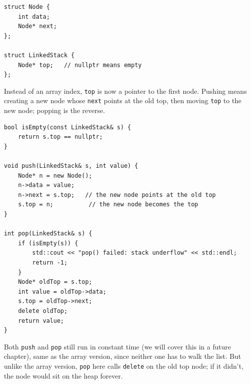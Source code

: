 \begin{verbatim}
struct Node {
    int data;
    Node* next;
};

struct LinkedStack {
    Node* top;   // nullptr means empty
};
\end{verbatim}

Instead of an array index, \texttt{top} is now a pointer to the first node. Pushing means creating a new node whose \texttt{next} points at the old top, then moving \texttt{top} to the new node; popping is the reverse.

\begin{center}
\end{center}

\begin{verbatim}
bool isEmpty(const LinkedStack& s) {
    return s.top == nullptr;
}

void push(LinkedStack& s, int value) {
    Node* n = new Node();
    n->data = value;
    n->next = s.top;   // the new node points at the old top
    s.top = n;          // the new node becomes the top
}

int pop(LinkedStack& s) {
    if (isEmpty(s)) {
        std::cout << "pop() failed: stack underflow" << std::endl;
        return -1;
    }
    Node* oldTop = s.top;
    int value = oldTop->data;
    s.top = oldTop->next;
    delete oldTop;
    return value;
}
\end{verbatim}

Both \texttt{push} and \texttt{pop} still run in constant time (we will cover this in a future chapter), same as the array version, since neither one has to walk the list. But unlike the array version, \texttt{pop} here calls \texttt{delete} on the old top node; if it didn't, the node would sit on the heap forever.

